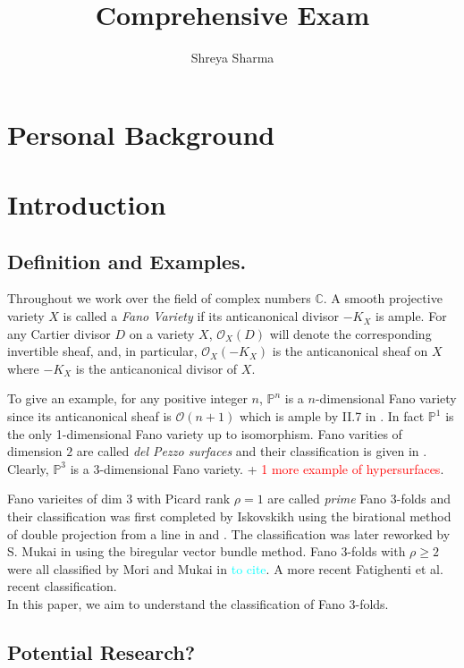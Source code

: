 \documentclass[11pt]{amsart}
\theoremstyle{plain}
\theoremstyle{definition}
\theoremstyle{expl}
\begin{document}
	\title{Comprehensive Exam}
	\date{}
	\author{\small{Shreya Sharma}}
	\maketitle
	\tableofcontents
	
\section{Personal Background}

\section{Introduction}
\subsection{Definition and Examples.} Throughout we work over the field of complex numbers $\mathbb{C}$.
A smooth projective variety $X$ is called a \textit{Fano Variety} if its anticanonical divisor $-K_X$ is ample.
For any Cartier divisor $D$ on a variety $X$, $\mathcal{O}_X(D)$ will denote the corresponding invertible sheaf, and, in particular, $\mathcal{O}_X(-K_X)$ is the anticanonical sheaf on $X$ where $-K_X$ is the anticanonical divisor of $X$. 

To give an example, for any positive integer $n$,  $\mathbb{P}^n$ is a $n$-dimensional Fano variety since its anticanonical sheaf is $\mathcal{O}(n+1)$ which is ample by II.7 in \cite{Hartshorne}. In fact $\mathbb{P}^1$ is the only 1-dimensional Fano variety up to isomorphism. Fano varities of dimension $2$ are called \textit{del Pezzo surfaces} and their classification is given in \cite{FanoV}. Clearly, $\mathbb{P}^3$ is a $3$-dimensional Fano variety. + \textcolor{red}{1 more example of hypersurfaces}. 

 Fano varieites of dim $3$ with Picard rank $\rho =1$ are called \textit{prime} Fano $3$-folds and their classification was first completed by Iskovskikh using the birational method of double projection from a line in \cite{Isk77} and \cite{Isk78}. The classification was later reworked by S. Mukai in \cite{Muk89} using the biregular vector bundle method. Fano $3$-folds with $\rho\geq 2$ were all classified by Mori and Mukai in \textcolor{cyan}{to cite}. A more recent Fatighenti et al. recent classification.\\
In this paper, we aim to understand the classification of Fano $3$-folds. 

\subsection{Potential Research?}
\end{document}
